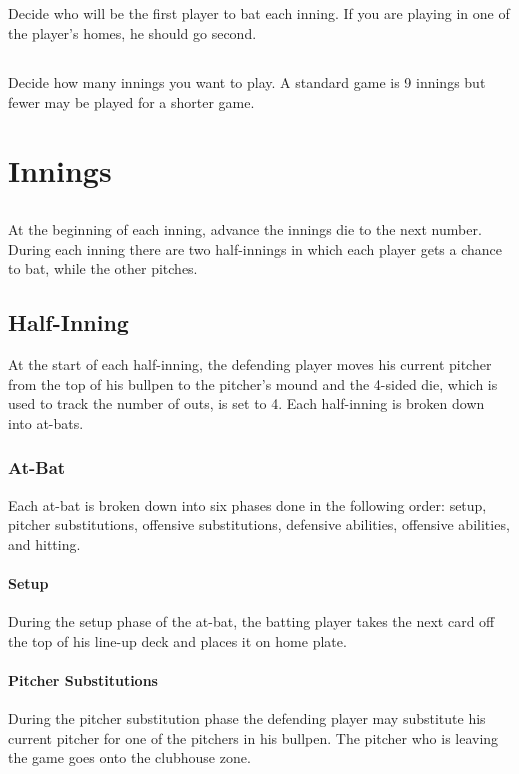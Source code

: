 \documentclass[12pt]{article} %
\begin{document}
\subsection{}
Decide who will be the first player to bat each inning.  If you are playing in one of the player's homes, he should go second.

\subsection{}
Decide how many innings you want to play.  A standard game is 9 innings but fewer may be played for a shorter game.

\section{Innings}

\subsection{}
At the beginning of each inning, advance the innings die to the next number.  During each inning there are two half-innings in which each player gets a chance to bat, while the other pitches.  

\subsection{Half-Inning}

At the start of each half-inning, the defending player moves his current pitcher from the top of his bullpen to the pitcher's mound and the 4-sided die, which is used to track the number of outs, is set to 4.  Each half-inning is broken down into at-bats.

\subsubsection{At-Bat}
Each at-bat is broken down into six phases done in the following order: setup, pitcher substitutions, offensive substitutions, defensive abilities, offensive abilities, and hitting.

\paragraph{Setup}
During the setup phase of the at-bat, the batting player takes the next card off the top of his line-up deck and places it on home plate.

\paragraph{Pitcher Substitutions}
During the pitcher substitution phase the defending player may substitute his current pitcher for one of the pitchers in his bullpen.  The pitcher who is leaving the game goes onto the clubhouse zone.
\end{document}
